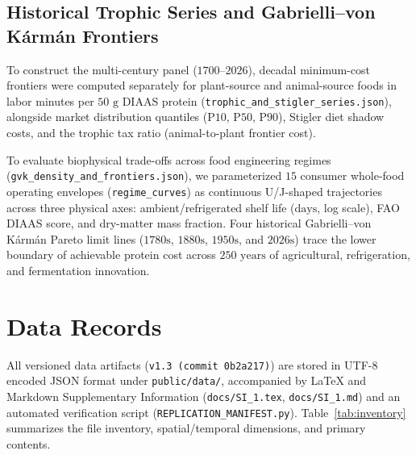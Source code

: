 \documentclass[11pt,a4paper]{article}
\begin{document}
\subsection{Historical Trophic Series and Gabrielli--von K\'arm\'an Frontiers}
To construct the multi-century panel ($1700\text{--}2026$), decadal minimum-cost frontiers were computed separately for plant-source and animal-source foods in labor minutes per $50\text{ g}$ DIAAS protein (\texttt{trophic\_and\_stigler\_series.json}), alongside market distribution quantiles ($\text{P10}$, $\text{P50}$, $\text{P90}$), Stigler diet shadow costs, and the trophic tax ratio (animal-to-plant frontier cost).

To evaluate biophysical trade-offs across food engineering regimes (\texttt{gvk\_density\_and\_frontiers.json}), we parameterized $15$ consumer whole-food operating envelopes (\texttt{regime\_curves}) as continuous U/J-shaped trajectories across three physical axes: ambient/refrigerated shelf life ($\text{days}$, log scale), FAO DIAAS score, and dry-matter mass fraction. Four historical Gabrielli--von K\'arm\'an Pareto limit lines ($1780\text{s}$, $1880\text{s}$, $1950\text{s}$, and $2026\text{s}$) trace the lower boundary of achievable protein cost across $250\text{ years}$ of agricultural, refrigeration, and fermentation innovation.

\section{Data Records}

All versioned data artifacts (\texttt{v1.3 (commit 0b2a217)}) are stored in UTF-8 encoded JSON format under \texttt{public/data/}, accompanied by LaTeX and Markdown Supplementary Information (\texttt{docs/SI\_1.tex}, \texttt{docs/SI\_1.md}) and an automated verification script (\texttt{REPLICATION\_MANIFEST.py}). Table~\ref{tab:inventory} summarizes the file inventory, spatial/temporal dimensions, and primary contents.
\end{document}
